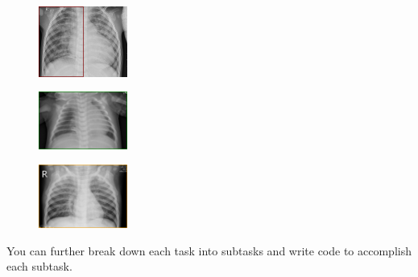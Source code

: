 \begin{center}
        \begin{minipage}{.27\linewidth}
            \begin{figure}[H]
                \centering
                \includegraphics[width=110px]{red_border.png}
            \end{figure}
        \end{minipage}
        \begin{minipage}{.27\linewidth}
            \begin{figure}[H]
                \centering
                \includegraphics[width=110px]{green_border.png}
            \end{figure}
        \end{minipage}
        \begin{minipage}{.27\linewidth}
            \begin{figure}[H]
            \centering
                \includegraphics[width=110px]{orange_border.png}
            \end{figure}
        \end{minipage}
\end{center}

                  
    
    You can further break down each task into subtasks and write code to
    accomplish each subtask.
\newpage